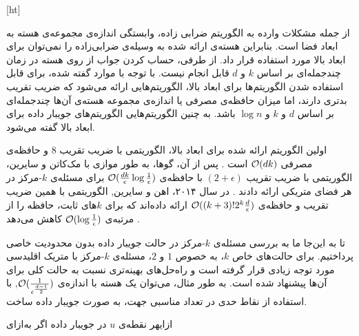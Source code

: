 [ht]

از جمله مشکلات وارده به الگوریتم ضرابی زاده، وابستگی اندازه‌ی مجموعه‌ی هسته به ابعاد فضا است. بنابراین هسته‌ی ارائه شده به وسیله‌ی ضرابی‌زاده را نمی‌توان برای ابعاد بالا مورد استفاده قرار داد. از طرفی، حساب کردن جواب از روی هسته در زمان چند‌جمله‌ای بر اساس $k$ و $d$ قابل انجام نیست. با توجه با موارد گفته شده، برای قابل استفاده شدن الگوریتم‌ها برای ابعاد بالا، الگوریتم‌هایی ارائه می‌شود که ضریب تقریب بدتری دارند، اما میزان حافظه‌ی مصرفی یا اندازه‌ی مجموعه هسته‌‌ی آن‌ها چندجمله‌ای بر اساس $d$ و $k$ و $\log{n}$ باشد. به چنین الگوریتم‌هایی الگوریتم‌های جویبار داده برای ابعاد بالا گفته می‌شود. 

اولین الگوریتم ارائه شده برای ابعاد بالا،  الگوریتمی با ضریب تقریب $8$ و حافظه‌ی مصرفی $\mathcal{O}(dk)$ است . پس از آن، گوها، به طور موازی با مک‌کاتن و سایرین، الگوریتمی با ضریب تقریب $(2+\epsilon)$ با حافظه‌ی $\mathcal{O}(\frac{dk}{\epsilon} \log{\frac{1}{\epsilon}})$ برای مسئله‌ی $k$-مرکز در هر فضای متریکی ارائه دادند . در سال ۲۰۱۴، اهن و سایرین, الگوریتمی با همین ضریب تقریب و حافظه‌ی $\mathcal{O}((k+3)!2^k\frac{d}{\epsilon})$ ارائه داده‌اند که برای $k$‌های ثابت، حافظه را از مرتبه‌ی $\mathcal{O}(\log{\frac{1}{\epsilon}})$ کاهش می‌دهد . 

تا به این‌جا ما به بررسی مسئله‌ی $k$-مرکز‌ در حالت جویبار داده بدون محدودیت خاصی پرداختیم. برای حالت‌های خاص $k$، به خصوص $1$ و $2$، مسئله‌ی $k$-مرکز با متریک اقلیدسی مورد توجه زیادی قرار گرفته است و راه‌حل‌های بهینه‌تری نسبت به حالت کلی برای آن‌ها پیشنهاد شده است. به طور مثال، می‌توان یک هسته با اندازه‌ی‌ $\mathcal{O}(\frac{1}{\epsilon^{\frac{d-1}{2}}})$, با استفاده از نقاط حدی در تعداد مناسبی جهت، به صورت جویبار داده ساخت. 

‌ازای{هر نقطه‌ی $u$ در جویبار داده}
‌اگر
‌به‌ازای

